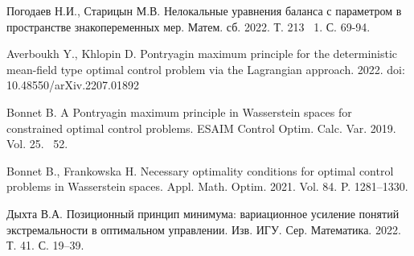 \begin{thebibliography}{9} %

 Погодаев Н.И., Старицын М.В. Нелокальные уравнения баланса с параметром в пространстве знакопеременных мер. Матем. сб. 2022. Т. 213 \textnumero~1. С. 69-94.

 Averboukh Y., Khlopin D. Pontryagin maximum principle for the deterministic mean-field type optimal control problem via the Lagrangian approach. 2022. doi:
10.48550/arXiv.2207.01892

 Bonnet B. A Pontryagin maximum principle in Wasserstein spaces for constrained optimal control problems. ESAIM Control Optim. Calc. Var. 2019. Vol. 25.  \textnumero~52. 

 Bonnet B., Frankowska H. Necessary optimality conditions for optimal control problems in Wasserstein spaces. Appl. Math. Optim. 2021. Vol. 84. P. 1281--1330.

 Дыхта В.А. Позиционный принцип минимума: вариационное усиление понятий экстремальности в оптимальном управлении. Изв. ИГУ. Сер. Математика. 2022. Т. 41. С. 19--39.

\end{thebibliography}





%

